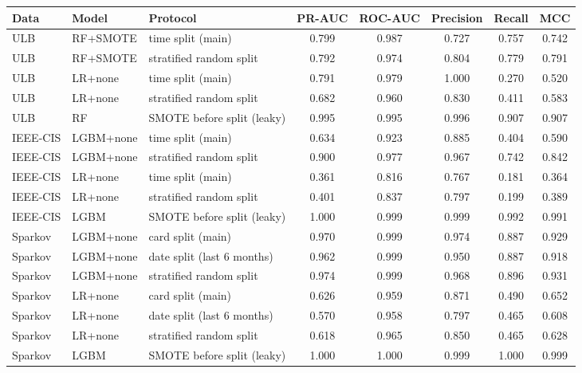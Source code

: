 \begin{tabular}{lllccccc}
\hline
Data & Model & Protocol & PR-AUC & ROC-AUC & Precision & Recall & MCC \\
\hline
ULB & RF+SMOTE & time split (main) & 0.799 & 0.987 & 0.727 & 0.757 & 0.742 \\
ULB & RF+SMOTE & stratified random split & 0.792 & 0.974 & 0.804 & 0.779 & 0.791 \\
ULB & LR+none & time split (main) & 0.791 & 0.979 & 1.000 & 0.270 & 0.520 \\
ULB & LR+none & stratified random split & 0.682 & 0.960 & 0.830 & 0.411 & 0.583 \\
ULB & RF & SMOTE before split (leaky) & 0.995 & 0.995 & 0.996 & 0.907 & 0.907 \\
IEEE-CIS & LGBM+none & time split (main) & 0.634 & 0.923 & 0.885 & 0.404 & 0.590 \\
IEEE-CIS & LGBM+none & stratified random split & 0.900 & 0.977 & 0.967 & 0.742 & 0.842 \\
IEEE-CIS & LR+none & time split (main) & 0.361 & 0.816 & 0.767 & 0.181 & 0.364 \\
IEEE-CIS & LR+none & stratified random split & 0.401 & 0.837 & 0.797 & 0.199 & 0.389 \\
IEEE-CIS & LGBM & SMOTE before split (leaky) & 1.000 & 0.999 & 0.999 & 0.992 & 0.991 \\
Sparkov & LGBM+none & card split (main) & 0.970 & 0.999 & 0.974 & 0.887 & 0.929 \\
Sparkov & LGBM+none & date split (last 6 months) & 0.962 & 0.999 & 0.950 & 0.887 & 0.918 \\
Sparkov & LGBM+none & stratified random split & 0.974 & 0.999 & 0.968 & 0.896 & 0.931 \\
Sparkov & LR+none & card split (main) & 0.626 & 0.959 & 0.871 & 0.490 & 0.652 \\
Sparkov & LR+none & date split (last 6 months) & 0.570 & 0.958 & 0.797 & 0.465 & 0.608 \\
Sparkov & LR+none & stratified random split & 0.618 & 0.965 & 0.850 & 0.465 & 0.628 \\
Sparkov & LGBM & SMOTE before split (leaky) & 1.000 & 1.000 & 0.999 & 1.000 & 0.999 \\
\hline
\end{tabular}
